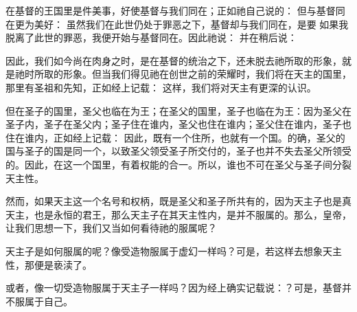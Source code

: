 在基督的王国里是件美事，好使基督与我们同在；正如祂自己说的： 但与基督同在更为美好： 虽然我们在此世仍处于罪恶之下，基督却与我们同在，是要  如果我脱离了此世的罪恶，我便开始与基督同在。因此祂说： 并在稍后说：\par

因此，我们如今尚在肉身之时，是在基督的统治之下，还未脱去祂所取的形象，就是祂时所取的形象。但当我们得见祂在创世之前的荣耀时，我们将在天主的国里，那里有圣祖和先知，正如经上记载： 这样，我们将对天主有更深的认识。\par

但在圣子的国里，圣父也临在为王；在圣父的国里，圣子也临在为王：因为圣父在圣子内，圣子在圣父内；圣子住在谁内，圣父也住在谁内；圣父住在谁内，圣子也住在谁内，正如经上记载： 因此，既有一个住所，也就有一个国。的确，圣父的国与圣子的国是同一个，以致圣父领受圣子所交付的，圣子也并不失去圣父所领受的。因此，在这一个国里，有着权能的合一。所以，谁也不可在圣父与圣子间分裂天主性。\par

\par

然而，如果天主这一个名号和权柄，既是圣父和圣子所共有的，因为天主子也是真天主，也是永恒的君王，那么天主子在其天主性内，是并不服属的。那么，皇帝，让我们思想一下，我们又当如何看待祂的服属呢？\par

天主子是如何服属的呢？像受造物服属于虚幻一样吗？可是，若这样去想象天主性，那便是亵渎了。\par

或者，像一切受造物服属于天主子一样吗？因为经上确实记载说：？可是，基督并不服属于自己。\par

